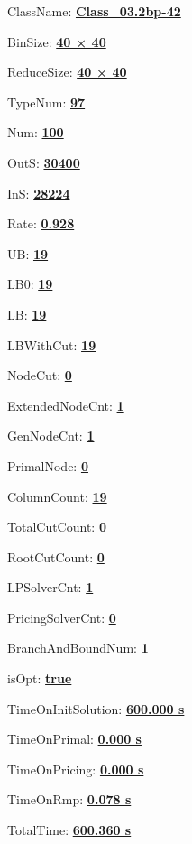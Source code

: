 \documentclass[11pt]{article}
\begin{document}
\pagestyle{empty}


ClassName: \underline{\textbf{Class_03.2bp-42}}
\par
BinSize: \underline{\textbf{40 × 40}}
\par
ReduceSize: \underline{\textbf{40 × 40}}
\par
TypeNum: \underline{\textbf{97}}
\par
Num: \underline{\textbf{100}}
\par
OutS: \underline{\textbf{30400}}
\par
InS: \underline{\textbf{28224}}
\par
Rate: \underline{\textbf{0.928}}
\par
UB: \underline{\textbf{19}}
\par
LB0: \underline{\textbf{19}}
\par
LB: \underline{\textbf{19}}
\par
LBWithCut: \underline{\textbf{19}}
\par
NodeCut: \underline{\textbf{0}}
\par
ExtendedNodeCnt: \underline{\textbf{1}}
\par
GenNodeCnt: \underline{\textbf{1}}
\par
PrimalNode: \underline{\textbf{0}}
\par
ColumnCount: \underline{\textbf{19}}
\par
TotalCutCount: \underline{\textbf{0}}
\par
RootCutCount: \underline{\textbf{0}}
\par
LPSolverCnt: \underline{\textbf{1}}
\par
PricingSolverCnt: \underline{\textbf{0}}
\par
BranchAndBoundNum: \underline{\textbf{1}}
\par
isOpt: \underline{\textbf{true}}
\par
TimeOnInitSolution: \underline{\textbf{600.000 s}}
\par
TimeOnPrimal: \underline{\textbf{0.000 s}}
\par
TimeOnPricing: \underline{\textbf{0.000 s}}
\par
TimeOnRmp: \underline{\textbf{0.078 s}}
\par
TotalTime: \underline{\textbf{600.360 s}}
\par
\newpage


\end{document}

